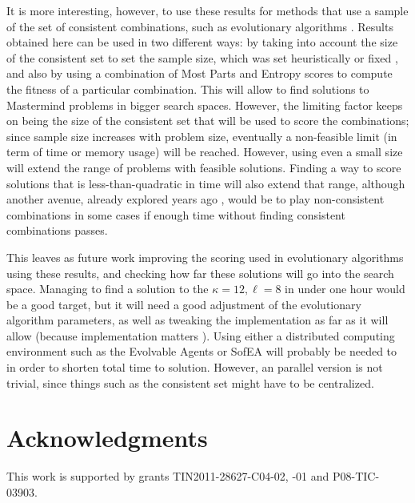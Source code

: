 \documentclass[preprint,12pt]{elsarticle}
\begin{document}
It is more interesting, however, to use these results for methods that
use a sample of the set of consistent combinations, such as
evolutionary algorithms
\cite{DBLP:conf/evoW/GuervosCM11,Berghman20091880}. Results obtained
here can be used in two different ways: by taking into account the
size of the consistent set to set the sample size, which was set
heuristically \cite{nicso} or fixed \cite{Berghman20091880}, and also
by using a combination of Most Parts and Entropy scores to compute the
fitness of a particular combination. This will allow to find solutions
to Mastermind problems in bigger search spaces. However, the limiting
factor keeps on being the size of the consistent set that will be used
to score the combinations; since sample size increases with problem
size, eventually a non-feasible limit (in term of time or memory
usage) will be reached. However, using even a small size will extend
the range of problems with feasible solutions. Finding a way to score
solutions that is less-than-quadratic in time will also extend that
range, although another avenue, already explored years ago
\cite{jj-ppsn96}, would be to play non-consistent combinations in some
cases if enough time without finding consistent combinations passes.

This leaves as future work improving the scoring used in evolutionary
algorithms using these results, and checking how far these solutions
will go into the search space. Managing to find a solution to the
$\kappa=12,\ell=8$ in under one hour would be a good target, but it
will need a good adjustment of the evolutionary algorithm parameters,
as well as tweaking the implementation as far as it will allow
(because implementation matters
\cite{DBLP:conf/iwann/MereloRACML11}). Using either a distributed
computing environment such as the Evolvable Agents \cite{juanlu:SC08}
or SofEA \cite{sofea:naco} will probably be needed to in order to
shorten total time to solution. However, an parallel version is not
trivial, since things such as the consistent set might have to be centralized.

\section*{Acknowledgments}

 This work is supported by grants TIN2011-28627-C04-02, -01 and  P08-TIC-03903.



\end{document}
